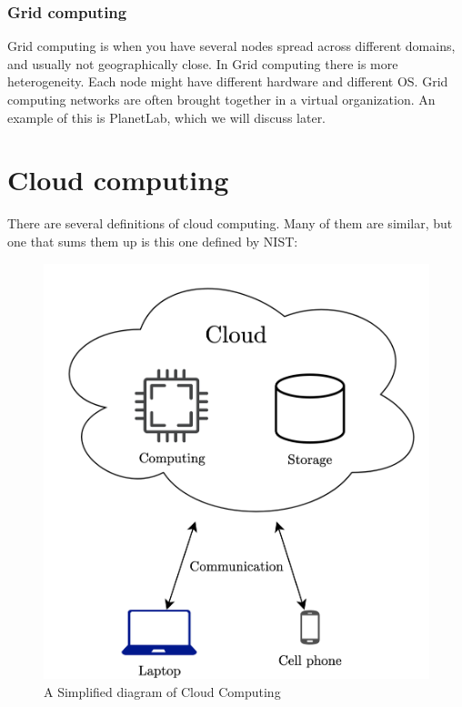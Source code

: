 \subsubsection{Grid computing}
Grid computing is when you have several nodes spread across different domains, and usually not geographically close. In Grid computing there is more heterogeneity. Each node might have different hardware and different OS. Grid computing networks are often brought together in a virtual organization. An example of this is PlanetLab, which we will discuss later. 








\section{Cloud computing}
There are several definitions of cloud computing. Many of them are similar, but one that sums them up is this one defined by NIST\cite{mell_nist_nodate}:


\begin{figure}[t]
    \centering
    \includegraphics[scale=0.7]{chapters/background/figures/Simplified_cloud.png}
    \caption{A Simplified diagram of Cloud Computing}
    \label{fig:SimplifiedCloudDiagram}
\end{figure}

